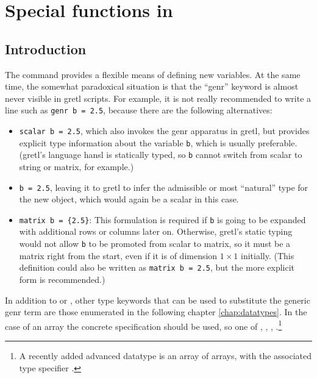 \chapter{Special functions in }
\label{chap:genr}

\section{Introduction}
\label{genr-intro}

The  command provides a flexible means of defining new
variables. At the same time, the somewhat paradoxical situation is
that the ``genr'' keyword is almost never visible in gretl scripts. 
For example, it is not really recommended to write a line such as 
\texttt{genr b = 2.5}, because there are the following alternatives:

\begin{itemize}
\item \texttt{scalar b = 2.5}, which also invokes the genr apparatus
  in gretl, but provides explicit type information about the variable
  \texttt{b}, which is usually preferable. (gretl's language hansl is
  statically typed, so \texttt{b} cannot switch from scalar to string
  or matrix, for example.)
  
\item \texttt{b = 2.5}, leaving it to gretl to infer the admissible or
  most ``natural'' type for the new object, which would again be a
  scalar in this case.

\item \texttt{matrix b = \{2.5\}}: This formulation is required if
  \texttt{b} is going to be expanded with additional rows or columns
  later on. Otherwise, gretl's static typing would not allow
  \texttt{b} to be promoted from scalar to matrix, so it must be a
  matrix right from the start, even if it is of dimension $1 \times 1$
  initially.  (This definition could also be written as \texttt{matrix
    b = 2.5}, but the more explicit form is recommended.)
\end{itemize}

In addition to  or , other type keywords that
can be used to substitute the generic genr term are those enumerated
in the following chapter \ref{chap:datatypes}. In the case of an array
the concrete specification should be used, so one of , 
, , .\footnote{A recently added 
advanced datatype is an array of arrays, with the associated type 
specifier .}

